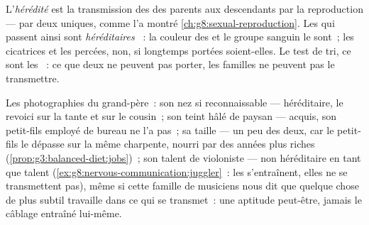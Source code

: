 \begin{definition}[L'hérédité]\label{def:g9:heredity-and-traits:heredity}
L'\emph{hérédité} est la transmission des
 des parents aux descendants par la reproduction
--- par deux  uniques, comme l'a montré
\cref{ch:g8:sexual-reproduction}. Les  qui
passent ainsi sont \emph{héréditaires}
~: la couleur des  et le groupe sanguin le
sont~; les cicatrices et les  percées, non, si
longtemps portées soient-elles. Le test de tri, ce sont les
~: ce que deux  ne peuvent pas porter, les
familles ne peuvent pas le transmettre.
\end{definition}

\begin{example}\label{ex:g9:heredity-and-traits:album}
Les photographies du grand-père~: son nez si reconnaissable
--- héréditaire, le revoici sur la tante et sur le cousin~;
son teint hâlé de paysan --- acquis, son petit-fils
employé de bureau ne l'a pas~; sa taille --- un peu des
deux, car le petit-fils le dépasse sur la même charpente,
nourri par des années plus riches
(\cref{prop:g3:balanced-diet:jobs})~; son talent de
violoniste --- non héréditaire en tant que talent
(\cref{ex:g8:nervous-communication:juggler}~: les 
s'entraînent, elles ne se transmettent pas), même si cette
famille de musiciens nous dit que quelque chose de plus
subtil travaille dans ce qui se transmet~: une aptitude
peut-être, jamais le câblage entraîné lui-même.
\end{example}

